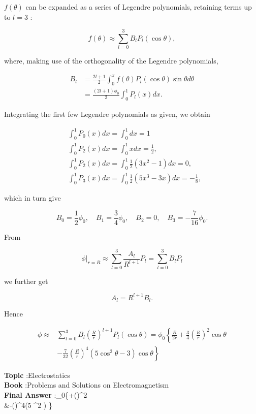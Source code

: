 \documentclass[10pt]{article}
\begin{document}
$f(\theta)$ can be expanded as a series of Legendre polynomials, retaining terms up to $l=3$ :

$$
f(\theta) \approx \sum_{l=0}^{3} B_{l} P_{l}(\cos \theta),
$$

where, making use of the orthogonality of the Legendre polynomials,

$$
\begin{aligned}
B_{l} &=\frac{2 l+1}{2} \int_{0}^{\pi} f(\theta) P_{l}(\cos \theta) \sin \theta d \theta \\
&=\frac{(2 l+1) \phi_{0}}{2} \int_{0}^{1} P_{l}(x) d x .
\end{aligned}
$$

Integrating the first few Legendre polynomials as given, we obtain

$$
\begin{aligned}
&\int_{0}^{1} P_{0}(x) d x=\int_{0}^{1} d x=1 \\
&\int_{0}^{1} P_{2}(x) d x=\int_{0}^{1} x d x=\frac{1}{2}, \\
&\int_{0}^{1} P_{2}(x) d x=\int_{0}^{1} \frac{1}{2}\left(3 x^{2}-1\right) d x=0, \\
&\int_{0}^{1} P_{3}(x) d x=\int_{0}^{1} \frac{1}{2}\left(5 x^{3}-3 x\right) d x=-\frac{1}{8},
\end{aligned}
$$

which in turn give

$$
B_{0}=\frac{1}{2} \phi_{0}, \quad B_{1}=\frac{3}{4} \phi_{0}, \quad B_{2}=0, \quad B_{3}=-\frac{7}{16} \phi_{0} .
$$

From

$$
\left.\phi\right|_{r=R} \approx \sum_{l=0}^{3} \frac{A_{l}}{R^{l+1}} P_{l}=\sum_{l=0}^{3} B_{l} P_{l}
$$

we further get

$$
A_{l}=R^{l+1} B_{l} .
$$

Hence

$$
\begin{aligned}
\phi \approx & \sum_{l=0}^{3} B_{l}\left(\frac{R}{r}\right)^{l+1} P_{l}(\cos \theta)=\phi_{0}\left\{\frac{R}{2 r}+\frac{3}{4}\left(\frac{R}{r}\right)^{2} \cos \theta\right.\\
&\left.-\frac{7}{32}\left(\frac{R}{r}\right)^{4}\left(5 \cos ^{2} \theta-3\right) \cos \theta\right\}
\end{aligned}
$$



\textbf{Topic} :Electrostatics\\
\textbf{Book} :Problems and Solutions on Electromagnetism\\
\textbf{Final Answer} :\phi_{0}\left\{+\left(\right)^{2} \cos \theta\right\\
&\left-\left(\right)^{4}\left(5 \cos ^{2} \right) \cos \theta\right\}\\
\end{document}
